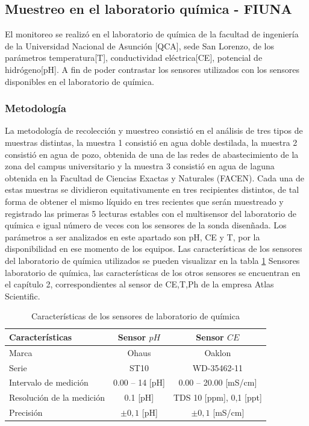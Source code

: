 \subsection{Muestreo en el laboratorio qu\'imica - FIUNA }
El monitoreo se realiz\'o en el laboratorio de qu\'imica de la facultad de ingenier\'ia de la Universidad Nacional de Asunci\'on [QCA], sede San Lorenzo, de los par\'ametros temperatura[T], conductividad el\'ectrica[CE], potencial de hidr\'ogeno[pH]. A fin de poder contrastar los sensores utilizados con los sensores disponibles en el laboratorio de qu\'imica.


\subsubsection{Metodolog\'ia }
La metodolog\'ia de recolección y muestreo consisti\'o en el an\'alisis de tres tipos de muestras distintas, la muestra 1 consisti\'o en agua doble destilada, la muestra 2 consisti\'o en agua de pozo, obtenida de una de las redes de abastecimiento de la zona del campus universitario y la muestra 3 consisti\'o en agua de laguna obtenida en la Facultad de Ciencias Exactas y Naturales (FACEN). Cada una de estas muestras se dividieron equitativamente en tres recipientes distintos, de tal forma de obtener el mismo l\'iquido en tres recientes que ser\'an muestreado y registrado las primeras 5 lecturas estables con el multisensor del laboratorio de qu\'imica e igual n\'umero de veces con los sensores de la sonda disen\~nada.
Los par\'ametros a ser analizados en este apartado son pH, CE y T, por la disponibilidad en ese momento de los equipos.
Las caracter\'isticas de los sensores del laboratorio de qu\'imica utilizados se pueden visualizar en la tabla \ref{tab: Sensores laboratorio de quimica}
Sensores laboratorio de qu\'imica, las caracter\'isticas de los otros sensores se encuentran en el cap\'itulo 2, correspondientes al sensor de CE,T,Ph de la empresa Atlas Scientific.
\begin{table}[H]
    \caption{Caracter\'isticas de los sensores de laboratorio de qu\'imica}
    \label{tab: Sensores laboratorio de quimica}
    \begin{tabular}{l c c}
        \toprule
        Caracter\'isticas & Sensor $pH$ & Sensor  $CE$ \\
        \midrule
        Marca & Ohaus       & Oaklon       \\
        Serie & ST10        & WD-35462-11  \\
        Intervalo de medici\'on                      & 0.00 – 14 {[}pH{]} & 0.00 – 20.00 {[}mS/cm{]}        \\
        Resoluci\'on de la medici\'on & 0.1   {[}pH{]}     & TDS 10 {[}ppm{]}, 0,1 {[}ppt{]} \\
        Precisi\'on                                  & $\pm0,1$ {[}pH{]}  & $\pm0,1$ {[}mS/cm{]}   
    \end{tabular}
 \end{table}
